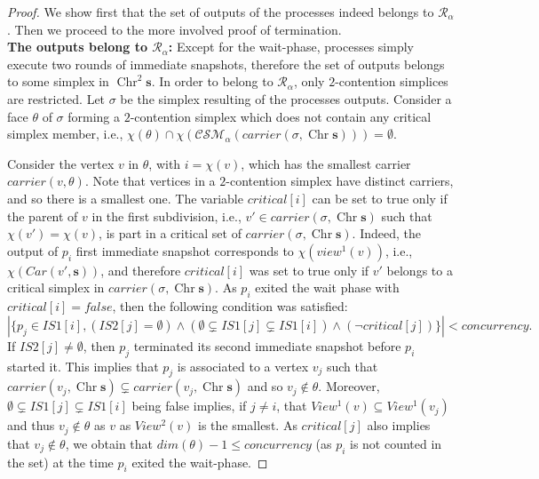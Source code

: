 \documentclass[a4paper]{article}
\def\R{\ensuremath{\mathcal{R}}}
\def\s {\mathbf{s}}
\def\Chr{\operatorname{Chr}}
\def\Car{\mathit{carrier}}
\begin{document}
\begin{proof} We show first that the set of outputs of the processes
  indeed belongs to $\R_\alpha$.
  Then we proceed to the more involved proof of termination.
\\
\noindent \textbf{The outputs belong to $\R_\alpha$: } 
Except for the wait-phase, processes simply execute two rounds of immediate snapshots, 
therefore the set of outputs belongs to some simplex in $\Chr^2\s$. 
In order to belong to $\R_\alpha$, only $2$-contention simplices are restricted. 
Let $\sigma$ be the simplex resulting of the processes outputs. 
Consider a face $\theta$ of $\sigma$ forming a $2$-contention simplex
which does not contain any critical simplex member, i.e.,
$\chi(\theta)\cap\chi(\mathcal{CSM}_\alpha(\Car(\sigma,\Chr\s)))=\emptyset$.

Consider the vertex $v$ in $\theta$, with $i=\chi(v)$, 
which has the smallest carrier $\Car(v,\theta)$. 
Note that vertices in a $2$-contention simplex have distinct
carriers, and so there is a smallest one.
The variable $\mathit{critical}[i]$ can be set to true 
only if the parent of $v$ in the first subdivision, i.e.,
$v'\in\Car(\sigma,\Chr\s)$ such that $\chi(v')=\chi(v)$,
is part in a critical set of $\Car(\sigma,\Chr\s)$.
Indeed, the output of $p_i$ first immediate snapshot
corresponds to $\chi(view^1(v))$, i.e., $\chi(Car(v',\s))$,
and therefore $\mathit{critical}[i]$ was set to 
true only if $v'$ belongs to a critical simplex in $\Car(\sigma,\Chr\s)$.
As $p_i$ exited the wait phase with $\mathit{critical}[i]=\mathit{false}$,
then the following condition was satisfied:
\[|\{p_j\in\mathit{IS1}[i], 
	(\mathit{IS2}[j]=\emptyset)\wedge
	(\emptyset\subsetneq \mathit{IS1}[j]\subsetneq\mathit{IS1}[i])\wedge
	(\neg \mathit{critical}[j])\}|< \mathit{concurrency}{}.
\]
If $\mathit{IS2}[j]\neq\emptyset$, then $p_j$
terminated its second immediate snapshot before $p_i$ started it.
This implies that $p_j$ is associated to a vertex $v_j$ such that
$\Car(v_j,\Chr\s)\subsetneq\Car(v_j,\Chr\s)$ and so $v_j\not\in \theta$.
Moreover, $\emptyset\subsetneq \mathit{IS1}[j]\subsetneq\mathit{IS1}[i]$ 
being false implies, if $j\neq i$, that $View^1(v)\subseteq View^1(v_j)$ 
and thus $v_j\not\in\theta$ as $v$ as $View^2(v)$ is the smallest. 
As $\mathit{critical}[j]$ also implies that $v_j\not\in\theta$,
we obtain that ${\mathit{dim}}(\theta)-1\leq\mathit{concurrency}$ 
(as $p_i$ is not counted in the set) at the time $p_i$ exited the wait-phase.


\end{proof}
\end{document}
